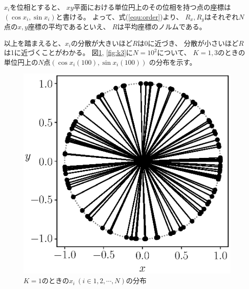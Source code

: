 \documentclass[a4j, titlepage]{jsarticle}
\numberwithin{equation}{section}
\begin{document}
            $x_i$を位相とすると、
            $xy$平面における単位円上のその位相を持つ点の座標は$(\cos x_i, \sin x_i)$と書ける。
            よって、式(\ref{equ:order})より、
            $R_x, R_y$はそれぞれ$N$点の$x, y$座標の平均であるといえ、
            $R$は平均座標のノルムである。

            以上を踏まえると、$x_i$の分散が大きいほど$R$は0に近づき、
            分散が小さいほど$R$は1に近づくことがわかる。
            図\ref{fig:k1}, \ref{fig:k3}に$N=10^2$について、
            $K=1, 3$のときの単位円上の$N$点$(\cos x_i(100), \sin x_i(100))$
            の分布を示す。
            \begin{figure}[h]
                \begin{minipage}{0.49\hsize}
                    \centering
                    \includegraphics[width=1\hsize]{kadai8/K1.eps}
                    \caption{
                        $K=1$のときの$x_i \ (i\in 1, 2, \cdots,N)$の分布
                    }
                    \label{fig:k1}
                \end{minipage}
                \begin{minipage}{0.49\hsize}
                    \centering

\end{minipage}
\end{figure}
\end{document}
